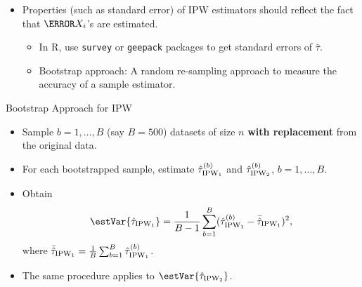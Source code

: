 \begin{itemize}
      \item Properties (such as standard error) of IPW estimators should
            reflect the fact that $ \ps{X_i} $'s are estimated.
            \begin{itemize}
                  \item In R, use \texttt{survey} or \texttt{geepack} packages to get standard errors of $ \hat{\tau} $.
                  \item Bootstrap approach: A random re-sampling approach to
                        measure the accuracy of a sample estimator.
            \end{itemize}
\end{itemize}
\begin{Regular}{Bootstrap Approach for IPW}
      \begin{itemize}
            \item Sample $ b=1,\ldots,B $ (say $ B=500 $) datasets of size $ n $ \textbf{with replacement}
                  from the original data.
            \item For each bootstrapped sample, estimate $ \hat{\tau}_{\text{IPW}_1}^{(b)} $ and $ \hat{\tau}_{\text{IPW}_2}^{(b)} $, $ b=1,\ldots,B $.
            \item Obtain
                  \[ \estVar{\hat{\tau}_{\IPW_1}}=\frac{1}{B-1}\sum_{b=1}^{B}(\hat{\tau}_{\IPW_1}^{(b)}-\bar{\hat{\tau}}_{\IPW_1})^2, \]
                  where $ \bar{\hat{\tau}}_{\text{IPW}_1}=\frac{1}{B}\sum_{b=1}^{B}\hat{\tau}_{\text{IPW}_1}^{(b)} $.
            \item The same procedure applies to $ \estVar{\hat{\tau}_{\IPW_2}} $.
      \end{itemize}
\end{Regular}
